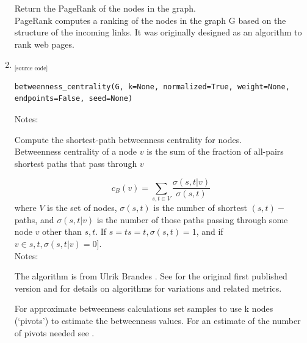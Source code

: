 \documentclass{article}
\begin{document}
\begin{enumerate}
Return the PageRank of the nodes in the graph. \\

PageRank computes a ranking of the nodes in the graph G based on the structure of the incoming links. It was originally designed as an algorithm to rank web pages.
\item  \href{https://networkx.github.io/documentation/networkx-1.11/reference/generated/networkx.algorithms.centrality.betweenness_centrality.html?highlight=betweenness_centrality}{} \href{https://networkx.github.io/documentation/networkx-1.11/_modules/networkx/algorithms/centrality/betweenness.html#betweenness_centrality}{$_{\text{[source code]}}$}
\begin{lstlisting}
betweenness_centrality(G, k=None, normalized=True, weight=None, endpoints=False, seed=None)
\end{lstlisting}

Notes: \\
 \cite{pr_algo1} \cite{pr_algo2}

Compute the shortest-path betweenness centrality for nodes.\\

Betweenness centrality of a node $v$ is the sum of the fraction of all-pairs shortest paths that pass through $v$

$$c_B(v)=\sum_{s,t \in V} \frac{\sigma (s,t|v)}{\sigma (s,t)}$$
where $V$ is the set of nodes, $\sigma (s,t)$ is the number of shortest $(s,t)-$paths, and $\sigma (s,t|v)$ is the number of those paths passing through some node $v$ other than $s,t$. If $s=ts=t, \sigma (s,t)=1$, and if $v\in s,t, \sigma (s,t|v)=0$].\\

Notes: \\

\par The algorithm is from Ulrik Brandes \cite{bc_algo1}. See \cite{bc_algo4} for the original first published version and \cite{bc_algo2} for details on algorithms for variations and related metrics.\\

\par For approximate betweenness calculations set samples to use k nodes (`pivots') to estimate the betweenness values. For an estimate of the number of pivots needed see \cite{bc_algo3}.\\


\end{enumerate}
\end{document}
